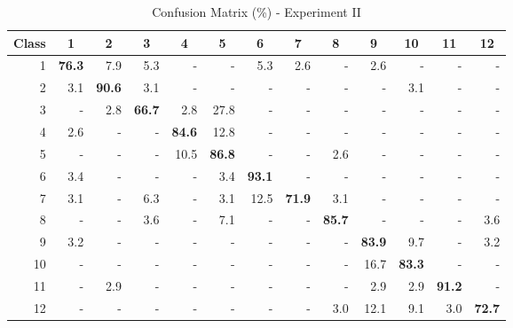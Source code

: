 \documentclass{article}[14pt, oneside, a4paper, times]
\begin{document}
\begin{table} [ht!]
\caption {Confusion Matrix (\%) - Experiment II}
\begin{center}
\begin{tabular}{rrrrrrrrrrrrr} \hline 
 \multicolumn{1}{c}{Class}&
 \multicolumn{1}{c}{1}&
 \multicolumn{1}{c}{2}&
 \multicolumn{1}{c}{3}&
 \multicolumn{1}{c}{4}&
 \multicolumn{1}{c}{5}&
 \multicolumn{1}{c}{6}&
 \multicolumn{1}{c}{7}&
 \multicolumn{1}{c}{8}&
 \multicolumn{1}{c}{9}&
 \multicolumn{1}{c}{10}&
 \multicolumn{1}{c}{11}&
 \multicolumn{1}{c}{12} \\ \hline
 
1	& \textbf{76.3} 	& 7.9 	& 5.3 	& -   	& -   	& 5.3 	& 2.6 	& -   	& 2.6 	& -   	& -   	& -   \\
2	& 3.1 	& \textbf{90.6} 	& 3.1 	& -   	& -   	& -   	& -   	& -   	& -   	& 3.1 	& -   	& -   \\
3	& -   	& 2.8 	& \textbf{66.7} 	& 2.8 	& 27.8 	& -   	& -   	& -   	& -   	& -   	& -   	& -   \\
4	& 2.6 	& -   	& -   	& \textbf{84.6} 	& 12.8 	& -   	& -   	& -   	& -   	& -   	& -   	& -   \\
5	& -   	& -   	& -   	& 10.5 	& \textbf{86.8} 	& -   	& -   	& 2.6 	& -   	& -   	& -   	& -   \\
6	& 3.4 	& -   	& -   	& -   	& 3.4 	& \textbf{93.1} 	& -   	& -   	& -   	& -   	& -   	& -   \\
7	& 3.1 	& -   	& 6.3 	& -   	& 3.1 	& 12.5 	& \textbf{71.9} 	& 3.1 	& -   	& -   	& -   	& -   \\
8	& -   	& -   	& 3.6 	& -   	& 7.1 	& -   	& -   	& \textbf{85.7} 	& -   	& -   	& -   	& 3.6 \\
9	& 3.2 	& -   	& -   	& -   	& -   	& -   	& -   	& -   	& \textbf{83.9} 	& 9.7 	& -   	& 3.2 \\
10	& -   	& -   	& -   	& -   	& -   	& -   	& -   	& -   	& 16.7 	& \textbf{83.3} 	& -   	& -   \\
11	& -   	& 2.9 	& -   	& -   	& -   	& -   	& -   	& -   	& 2.9 	& 2.9 	& \textbf{91.2} 	& -   \\
12	& -   	& -   	& -   	& -   	& -   	& -   	& -   	& 3.0 	& 12.1 	& 9.1 	& 3.0 	& \textbf{72.7} \\ \hline

\end{tabular}
\label{cmII:tab}
\end{center}
\end{table}
\end{document}
